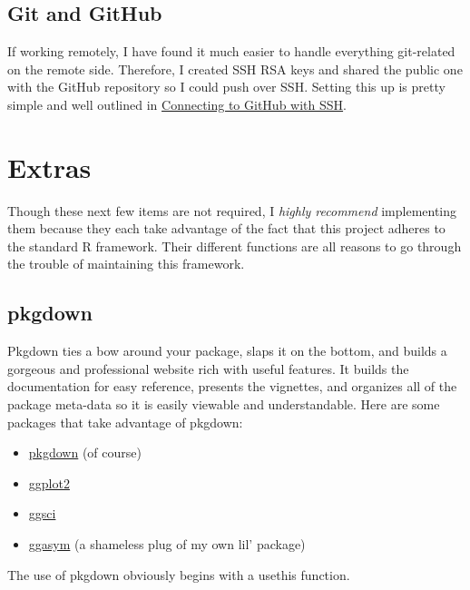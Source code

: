 \documentclass[]{book}
\providecommand{\tightlist}{%
  \setlength{\itemsep}{0pt}\setlength{\parskip}{0pt}}
\begin{document}
\hypertarget{git-and-github-1}{%
\subsection{Git and GitHub}\label{git-and-github-1}}

If working remotely, I have found it much easier to handle everything git-related on the remote side. Therefore, I created SSH RSA keys and shared the public one with the GitHub repository so I could push over SSH. Setting this up is pretty simple and well outlined in \href{https://help.github.com/en/articles/connecting-to-github-with-SSH}{Connecting to GitHub with SSH}.

\hypertarget{extras}{%
\section{Extras}\label{extras}}

Though these next few items are not required, I \emph{highly recommend} implementing them because they each take advantage of the fact that this project adheres to the standard R framework. Their different functions are all reasons to go through the trouble of maintaining this framework.

\hypertarget{pkgdown}{%
\subsection{pkgdown}\label{pkgdown}}

Pkgdown ties a bow around your package, slaps it on the bottom, and builds a gorgeous and professional website rich with useful features. It builds the documentation for easy reference, presents the vignettes, and organizes all of the package meta-data so it is easily viewable and understandable. Here are some packages that take advantage of pkgdown:

\begin{itemize}
\tightlist
\item
  \href{https://pkgdown.r-lib.org}{pkgdown} (of course)
\item
  \href{https://ggplot2.tidyverse.org}{ggplot2}
\item
  \href{https://nanx.me/ggsci/}{ggsci}
\item
  \href{https://jhrcook.github.io/ggasym/index.html}{ggasym} (a shameless plug of my own lil' package)
\end{itemize}

The use of pkgdown obviously begins with a usethis function.
\end{document}
